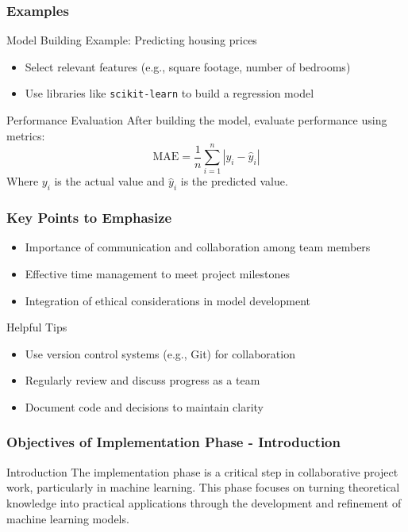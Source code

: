 \documentclass[aspectratio=169]{beamer}
\begin{document}
\begin{frame}[fragile]
  \frametitle{Examples}

  \begin{block}{Model Building}
    Example: Predicting housing prices
    \begin{itemize}
      \item Select relevant features (e.g., square footage, number of bedrooms)
      \item Use libraries like \texttt{scikit-learn} to build a regression model
    \end{itemize}
  \end{block}
  
  \begin{block}{Performance Evaluation}
    After building the model, evaluate performance using metrics:
    \begin{equation}
      \text{MAE} = \frac{1}{n} \sum_{i=1}^n |y_i - \hat{y}_i|
    \end{equation}
    Where \( y_i \) is the actual value and \( \hat{y}_i \) is the predicted value.
  \end{block}

\end{frame}

\begin{frame}[fragile]
  \frametitle{Key Points to Emphasize}

  \begin{itemize}
    \item Importance of communication and collaboration among team members
    \item Effective time management to meet project milestones
    \item Integration of ethical considerations in model development
  \end{itemize}
  
  \begin{block}{Helpful Tips}
    \begin{itemize}
      \item Use version control systems (e.g., Git) for collaboration
      \item Regularly review and discuss progress as a team
      \item Document code and decisions to maintain clarity
    \end{itemize}
  \end{block}
\end{frame}

\begin{frame}[fragile]
    \frametitle{Objectives of Implementation Phase - Introduction}
    \begin{block}{Introduction}
        The implementation phase is a critical step in collaborative project work, particularly in machine learning. 
        This phase focuses on turning theoretical knowledge into practical applications through the development and refinement of machine learning models.
    \end{block}
\end{frame}
\end{document}
